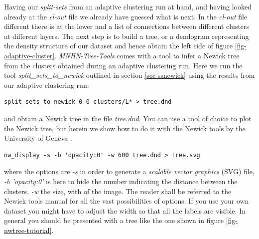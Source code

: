 Having our \emph{split-sets} from an adaptive clustering run at hand,
and having looked already at the \emph{cl-out} file we already have
guessed what is next. In the \emph{cl-out} file different there is at
the lower and a list of connections between different clusters at
different layers. The next step is to build a tree, or a dendogram
representing the density structure of our dataset and hence obtain the
left side of figure \ref{fig-adaptive-cluster}. \emph{MNHN-Tree-Tools} comes
with a tool to infer a Newick tree \cite{newick} from the clusters
obtained during an adaptive clustering run. Here we run the tool
\emph{split\_sets\_to\_newick} outlined in section \ref{sec-ssnewick}
using the results from our adaptive clustering run:
\begin{lstlisting}
split_sets_to_newick 0 0 clusters/L* > tree.dnd
\end{lstlisting}
and obtain a Newick tree in the file \emph{tree.dnd}. You can use a
tool of choice to plot the Newick tree, but herein we show how to do
it with the Newick tools by the University of Geneva
\cite{newick_tools}.
\begin{lstlisting}
nw_display -s -b 'opacity:0' -w 600 tree.dnd > tree.svg
\end{lstlisting}
where the options are \emph{-s} in order to generate a \emph{scalable
vector graphics} (SVG) file, \emph{-b 'opacity:0'} is here to hide the
number indicating the distance between the clusters. \emph{-w} the
size, with of the image. The reader shall be referred to the Newick
tools manual for all the vast possibilities of options. If you use
your own dataset you might have to adjust the width so that all the
labels are visible. In general you should be presented with a tree
like the one shown in figure \ref{fig-nwtree-tutorial}.
